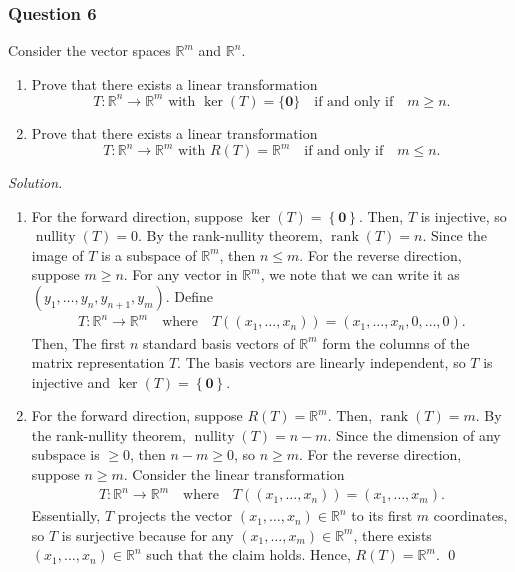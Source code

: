 \documentclass[12pt]{article}
\begin{document}
\subsubsection*{Question 6}
Consider the vector spaces $\mathbb R^m$ and $\mathbb R^n$.
\begin{enumerate}[label=\textbf{(\alph*)}]
\itemsep 0em
  \item Prove that there exists a linear transformation
        \[T:\mathbb R^{n}\to\mathbb R^{m}\text{ with }\ker\left(T\right)=\{\mathbf{0}\}\quad\text{if and only if}\quad m\ge n.\]
  \item Prove that there exists a linear transformation
        \[T:\mathbb R^{n}\to\mathbb R^{m}\text{ with }R(T)=\mathbb R^{m}\quad\text{if and only if}\quad m\le n.\]
\end{enumerate}
\noindent\emph{Solution.}
\begin{enumerate}[label=\textbf{(\alph*)}]
    \itemsep 0em
    \item For the forward direction, suppose $\operatorname{ker}\left(T\right)=\left\{\mathbf{0}\right\}$. Then, $T$ is injective, so $\operatorname{nullity}\left(T\right)=0$. By the rank-nullity theorem, $\operatorname{rank}\left(T\right)=n$. Since the image of $T$ is a subspace of $\mathbb{R}^m$, then $n\le m$.
    \newline
    \newline For the reverse direction, suppose $m\ge n$. For any vector in $\mathbb{R}^m$, we note that we can write it as $\left(y_1,\ldots,y_n,y_{n+1},y_m\right)$. Define \begin{align*}
        T:\mathbb{R}^n\to \mathbb{R}^m\quad\text{where}\quad T\left(\left(x_1,\ldots,x_n\right)\right)=\left(x_1,\ldots,x_n,0,\ldots,0\right).
    \end{align*}
    Then, The first $n$ standard basis vectors of $\mathbb{R}^m$ form the columns of the matrix representation $T$. The basis vectors are linearly independent, so $T$ is injective and $\operatorname{ker}\left(T\right)=\left\{\mathbf{0}\right\}$.
    \item For the forward direction, suppose $R\left(T\right)=\mathbb{R}^m$. Then, $\operatorname{rank}\left(T\right)=m$. By the rank-nullity theorem, $\operatorname{nullity}\left(T\right)=n-m$. Since the dimension of any subspace is $\ge 0$, then $n-m\ge 0$, so $n\ge m$.
    \newline
    \newline For the reverse direction, suppose $n \ge m$. Consider the linear transformation \begin{align*}
        T:\mathbb{R}^n\to\mathbb{R}^m\quad\text{where}\quad T\left(\left(x_1,\ldots,x_n\right)\right)=\left(x_1,\ldots,x_m\right).
    \end{align*}
    Essentially, $T$ projects the vector $\left(x_1,\ldots,x_n\right)\in\mathbb{R}^n$ to its first $m$ coordinates, so $T$ is surjective because for any $\left(x_1,\ldots,x_m\right)\in\mathbb{R}^m$, there exists $\left(x_1,\ldots,x_n\right)\in\mathbb{R}^n$ such that the claim holds. Hence, $R\left(T\right)=\mathbb{R}^m$. \qed 
\end{enumerate}
\newpage
\end{document}
